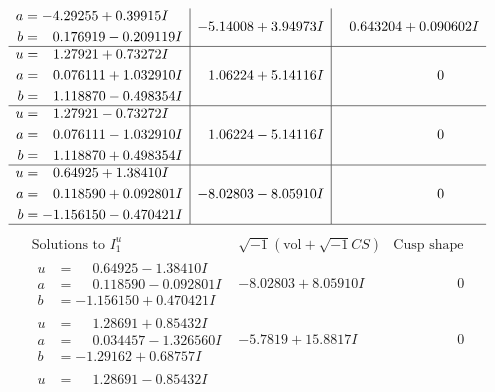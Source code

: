 \documentclass[1p]{elsarticle_modified}
\theoremstyle{definition}
\newcommand{\I}{\sqrt{-1}}
\begin{document}
$$\begin{array}{c|c|c}
\begin{aligned}
a &= -4.29255 + 0.39915 I \\
b &= \phantom{-}0.176919 - 0.209119 I\end{aligned}
 & -5.14008 + 3.94973 I & \phantom{-}0.643204 + 0.090602 I \\ \hline\begin{aligned}
u &= \phantom{-}1.27921 + 0.73272 I \\
a &= \phantom{-}0.076111 + 1.032910 I \\
b &= \phantom{-}1.118870 - 0.498354 I\end{aligned}
 & \phantom{-}1.06224 + 5.14116 I & \phantom{-0.000000 } 0 \\ \hline\begin{aligned}
u &= \phantom{-}1.27921 - 0.73272 I \\
a &= \phantom{-}0.076111 - 1.032910 I \\
b &= \phantom{-}1.118870 + 0.498354 I\end{aligned}
 & \phantom{-}1.06224 - 5.14116 I & \phantom{-0.000000 } 0 \\ \hline\begin{aligned}
u &= \phantom{-}0.64925 + 1.38410 I \\
a &= \phantom{-}0.118590 + 0.092801 I \\
b &= -1.156150 - 0.470421 I\end{aligned}
 & -8.02803 - 8.05910 I & \phantom{-0.000000 } 0\\
 \hline 
 \end{array}$$\newpage$$\begin{array}{c|c|c}  
\text{Solutions to }I^u_{1}& \I (\text{vol} + \sqrt{-1}CS) & \text{Cusp shape}\\
 \hline 
\begin{aligned}
u &= \phantom{-}0.64925 - 1.38410 I \\
a &= \phantom{-}0.118590 - 0.092801 I \\
b &= -1.156150 + 0.470421 I\end{aligned}
 & -8.02803 + 8.05910 I & \phantom{-0.000000 } 0 \\ \hline\begin{aligned}
u &= \phantom{-}1.28691 + 0.85432 I \\
a &= \phantom{-}0.034457 - 1.326560 I \\
b &= -1.29162 + 0.68757 I\end{aligned}
 & -5.7819 + 15.8817 I & \phantom{-0.000000 } 0 \\ \hline\begin{aligned}
u &= \phantom{-}1.28691 - 0.85432 I \\

\end{aligned}
\end{array}$$
\end{document}

